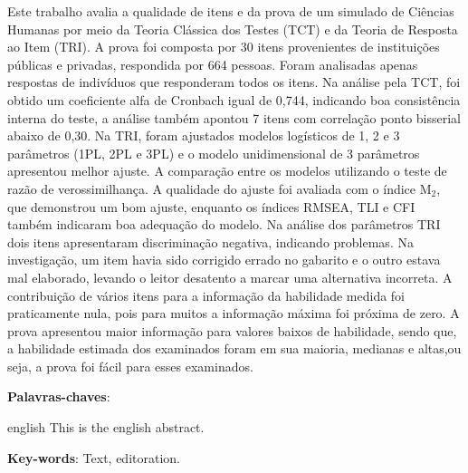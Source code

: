 \begin{resumo}
	
Este trabalho avalia a qualidade de itens e da prova de um simulado de Ciências Humanas por meio da Teoria Clássica dos Testes (TCT) e da Teoria de Resposta ao Item (TRI). A prova foi composta por 30 itens provenientes de instituições públicas e privadas, respondida por 664 pessoas. Foram analisadas apenas respostas de indivíduos que responderam todos os itens. Na análise pela TCT, foi obtido um coeficiente alfa de Cronbach igual de 0,744, indicando boa consistência interna do teste, a análise também apontou 7 itens com correlação ponto bisserial abaixo de 0,30.  Na TRI, foram ajustados modelos logísticos de 1, 2 e 3 parâmetros (1PL, 2PL e 3PL) e o modelo unidimensional de 3 parâmetros apresentou melhor ajuste. A comparação entre os modelos utilizando o teste de razão de verossimilhança. A qualidade do ajuste foi avaliada com o índice M$_2$, que demonstrou um bom ajuste,  enquanto os índices RMSEA, TLI e CFI também indicaram boa adequação do modelo. Na análise dos parâmetros TRI dois itens apresentaram discriminação negativa, indicando problemas. Na investigação, um item havia sido corrigido errado no gabarito e o outro estava mal elaborado, levando o leitor desatento a marcar uma alternativa incorreta. A contribuição de vários itens para a informação da habilidade medida foi praticamente nula, pois para muitos a informação máxima foi próxima de zero. A prova apresentou maior informação para valores baixos de habilidade, sendo que, a habilidade estimada dos examinados foram em sua maioria, medianas e altas,ou seja, a prova foi fácil para esses examinados.

\textbf{Palavras-chaves}: 
\end{resumo}

\begin{resumo}[Abstract]
 \begin{otherlanguage*}{english}
   This is the english abstract.

   \vspace{\onelineskip}

   \noindent
   \textbf{Key-words}: Text, editoration.
 \end{otherlanguage*}
\end{resumo}